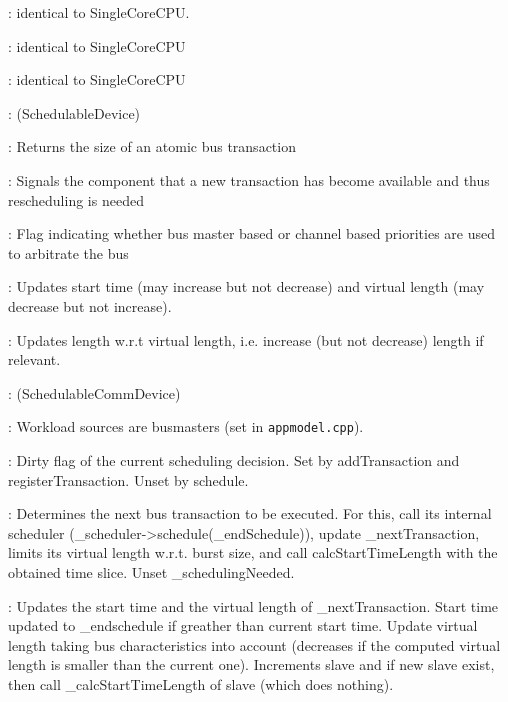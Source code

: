 \documentclass[a4paper,11pt]{article}
\newcommand{\bfont}{\fontseries{b}\selectfont}
\newcommand{\cod}[1]{{\ttfamily #1}}
\newcommand{\class}[2]{\par\vspace{1mm}\hspace{-5mm}\large\colorbox{file}{\textbullet\bfont\cod{#1}:} (\cod{#2})\par}
\newcommand{\method}[1]{\par\vspace{1mm}\hspace{-2mm}\colorbox{method}{\textopenbullet\bfont\cod{#1}:}}
\newcommand{\variable}[1]{\par\vspace{1mm}\hspace{-2mm}\colorbox{variable}{\textopenbullet\bfont\cod{#1}:}}
\begin{document}
\method{truncateAndAddNextTransAt(iTime)} identical to \cod{SingleCoreCPU}.

\method{truncateNextTransAt(iTime)} identical to \cod{SingleCoreCPU}

\method{truncateNextTrans(iTime)} identical to \cod{SingleCoreCPU}

\class{SchedulableComDevice}{SchedulableDevice}

\method{getBurstSize} Returns the size of an atomic bus transaction

\method{registerTransaction()} Signals the component that a new transaction has become available and thus rescheduling is needed

\variable{\_channelBasedPrio} Flag indicating whether bus master based or channel based priorities are used to arbitrate the bus

\method{virtual calcStartTimeLength(iTimeSlice)} Updates start time (may increase but not decrease) and virtual length (may decrease but not increase).
\method{virtual calcLength()} Updates length w.r.t virtual length, i.e. increase (but not decrease) length if relevant.

\class{Bus}{SchedulableCommDevice}

\variable{\_scheduler} Workload sources are busmasters (set in {\tt appmodel.cpp}).

\variable{\_schedulingNeeded} Dirty flag of the current scheduling decision. Set by \cod{addTransac\-tion} and \cod{registerTransaction}. Unset by \cod{schedule}.

\method{schedule()} Determines the next bus transaction to be executed. For this, call its internal scheduler (\cod{\_scheduler->schedule(\_endSchedule)}), update \cod{\_nextTransaction}, limits its virtual length w.r.t. burst size, and call \cod{calcStartTimeLength} with the obtained time slice. Unset \cod{\_schedulingNeeded}.

\method{calcStartTimeLength(iTimeSlice)} Updates the start time and the virtual length of \cod{\_nextTransaction}. Start time updated to \cod{\_endschedule} if greather than current start time. Update virtual length taking bus characteristics into account (decreases if the computed virtual length is smaller than the current one). Increments slave and if new slave exist, then call \cod{\_calcStartTimeLength} of slave (which does nothing).
\end{document}
